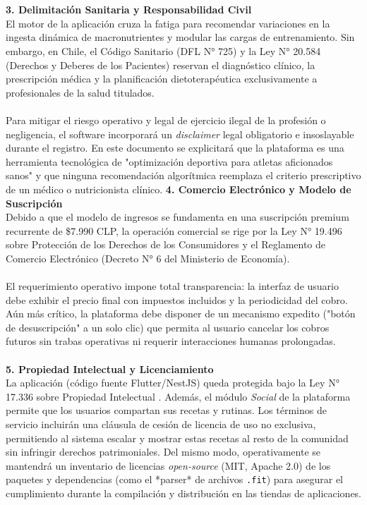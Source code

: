 \documentclass[12pt]{article}
\begin{document}
\\\\
\textbf{3. Delimitación Sanitaria y Responsabilidad Civil}\\
El motor de la aplicación cruza la fatiga para recomendar variaciones en la ingesta dinámica de macronutrientes y modular las cargas de entrenamiento. Sin embargo, en Chile, el Código Sanitario (DFL N° 725) \citep{dfl725} y la Ley N° 20.584 (Derechos y Deberes de los Pacientes) \citep{ley20584} reservan el diagnóstico clínico, la prescripción médica y la planificación dietoterapéutica exclusivamente a profesionales de la salud titulados.
\\\\
Para mitigar el riesgo operativo y legal de ejercicio ilegal de la profesión o negligencia, el software incorporará un \textit{disclaimer} legal obligatorio e insoslayable durante el registro. En este documento se explicitará que la plataforma es una herramienta tecnológica de "optimización deportiva para atletas aficionados sanos" y que ninguna recomendación algorítmica reemplaza el criterio prescriptivo de un médico o nutricionista clínico.
\newpage
\textbf{4. Comercio Electrónico y Modelo de Suscripción}\\
Debido a que el modelo de ingresos se fundamenta en una suscripción premium recurrente de \$7.990 CLP, la operación comercial se rige por la Ley N° 19.496 sobre Protección de los Derechos de los Consumidores \citep{ley19496} y el Reglamento de Comercio Electrónico (Decreto N° 6 del Ministerio de Economía).
\\\\
El requerimiento operativo impone total transparencia: la interfaz de usuario debe exhibir el precio final con impuestos incluidos y la periodicidad del cobro. Aún más crítico, la plataforma debe disponer de un mecanismo expedito ("botón de desuscripción" a un solo clic) que permita al usuario cancelar los cobros futuros sin trabas operativas ni requerir interacciones humanas prolongadas.
\\\\
\textbf{5. Propiedad Intelectual y Licenciamiento}\\
La aplicación (código fuente Flutter/NestJS) queda protegida bajo la Ley N° 17.336 sobre Propiedad Intelectual \citep{ley17336}. Además, el módulo \textit{Social} de la plataforma permite que los usuarios compartan sus recetas y rutinas. Los términos de servicio incluirán una cláusula de cesión de licencia de uso no exclusiva, permitiendo al sistema escalar y mostrar estas recetas al resto de la comunidad sin infringir derechos patrimoniales. Del mismo modo, operativamente se mantendrá un inventario de licencias \textit{open-source} (MIT, Apache 2.0) de los paquetes y dependencias (como el *parser* de archivos \texttt{.fit}) para asegurar el cumplimiento durante la compilación y distribución en las tiendas de aplicaciones.
\end{document}
